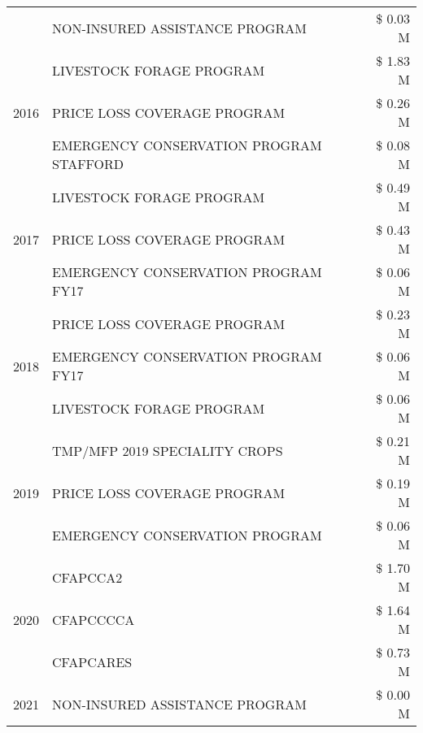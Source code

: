 \begin{tabular}{llr}
 & NON-INSURED ASSISTANCE PROGRAM & \$ 0.03 M \\
\cline{1-3}
\multirow[t]{3}{*}{2016} & LIVESTOCK FORAGE PROGRAM & \$ 1.83 M \\
 & PRICE LOSS COVERAGE PROGRAM & \$ 0.26 M \\
 & EMERGENCY CONSERVATION PROGRAM STAFFORD & \$ 0.08 M \\
\cline{1-3}
\multirow[t]{3}{*}{2017} & LIVESTOCK FORAGE PROGRAM & \$ 0.49 M \\
 & PRICE LOSS COVERAGE PROGRAM & \$ 0.43 M \\
 & EMERGENCY CONSERVATION PROGRAM FY17 & \$ 0.06 M \\
\cline{1-3}
\multirow[t]{3}{*}{2018} & PRICE LOSS COVERAGE PROGRAM & \$ 0.23 M \\
 & EMERGENCY CONSERVATION PROGRAM FY17 & \$ 0.06 M \\
 & LIVESTOCK FORAGE PROGRAM & \$ 0.06 M \\
\cline{1-3}
\multirow[t]{3}{*}{2019} & TMP/MFP 2019 SPECIALITY CROPS & \$ 0.21 M \\
 & PRICE LOSS COVERAGE PROGRAM & \$ 0.19 M \\
 & EMERGENCY CONSERVATION PROGRAM & \$ 0.06 M \\
\cline{1-3}
\multirow[t]{3}{*}{2020} & CFAPCCA2 & \$ 1.70 M \\
 & CFAPCCCCA & \$ 1.64 M \\
 & CFAPCARES & \$ 0.73 M \\
\cline{1-3}
2021 & NON-INSURED ASSISTANCE PROGRAM & \$ 0.00 M \\
\cline{1-3}
\bottomrule
\end{tabular}
